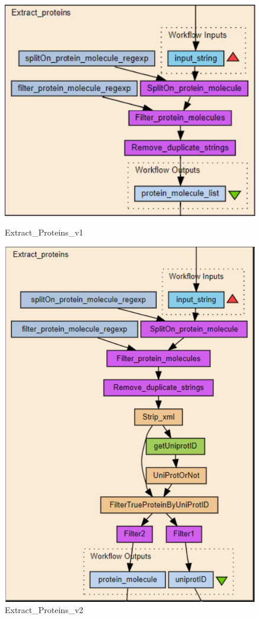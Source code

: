 \documentclass[ao]{iosart2x}
\begin{document}
\begin{figure}[htpb]
    \begin{minipage}{.45\textwidth}
        \includegraphics[width=0.95\linewidth]{figures/workflow-v0.pdf}
        \caption{Extract\_Proteins\_v1}
        \label{fig:v1}
    \end{minipage}
    \begin{minipage}{.45\textwidth}
        \includegraphics[width=0.95\linewidth]{figures/workflow-v1.pdf}
        \caption{Extract\_Proteins\_v2}
        \label{fig:v2}
    \end{minipage}
\end{figure}
\end{document}

